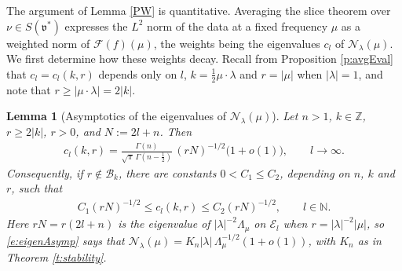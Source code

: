 \documentclass[11pt]{amsart}
\theoremstyle{plain}
\newtheorem{lemma}[theorem]{Lemma}
\theoremstyle{definition}
\theoremstyle{remark}
\numberwithin{equation}{section}
\def\fv{\mathfrak{v}}
\def\cB{\mathcal{B}}
\def\cE{\mathcal{E}}
\def\cN{\mathcal{N}}
\def\cF{\mathcal{F}}
\def\N{{\mathbb N}}%
\def\Z{{\mathbb Z}}%
\numberwithin{equation}{section}
\begin{document}
The argument of Lemma \ref{PW} is quantitative. Averaging the slice theorem over $\nu\in S(\fv^*)$ expresses the $L^2$ norm of the data at a fixed frequency $\mu$ as a weighted norm of $\cF(f)(\mu)$, the weights being the eigenvalues $c_l$ of $\cN_\lambda(\mu)$. We first determine how these weights decay. Recall from Proposition \ref{p:avgEval} that $c_l=c_l(k, r)$ depends only on $l$, $k=\tfrac12\mu\cdot\lambda$ and $r=|\mu|$ when $|\lambda|=1$, and note that $r\geq|\mu\cdot\lambda|=2|k|$.
\begin{lemma}[Asymptotics of the eigenvalues of $\cN_\lambda(\mu)$]\label{l:eigenAsymp}
	Let $n>1$, $k\in \Z$, $r\geq 2|k|$, $r>0$, and $N:=2l+n$. Then
	\begin{align}\label{e:eigenAsymp}
		c_l(k, r)=\frac{\Gamma(n)}{\sqrt{\pi}\,\Gamma(n-\tfrac12)}\,(rN)^{-1/2}\big(1+o(1)\big), \qquad l\to\infty.
	\end{align}
	Consequently, if $r\notin\cB_k$, there are constants $0<C_1\leq C_2$, depending on $n$, $k$ and $r$, such that
	\begin{align}\label{e:eigenBounds}
		C_1(rN)^{-1/2}\leq c_l(k, r)\leq C_2(rN)^{-1/2}, \qquad l\in \N.
	\end{align}
	Here $rN=r(2l+n)$ is the eigenvalue of $|\lambda|^{-2}\Lambda_\mu$ on $\cE_l$ when $r=|\lambda|^{-2}|\mu|$, so \eqref{e:eigenAsymp} says that $\cN_\lambda(\mu)=K_n|\lambda|\,\Lambda_\mu^{-1/2}(1+o(1))$, with $K_n$ as in Theorem \ref{t:stability}.
\end{lemma}
\end{document}
